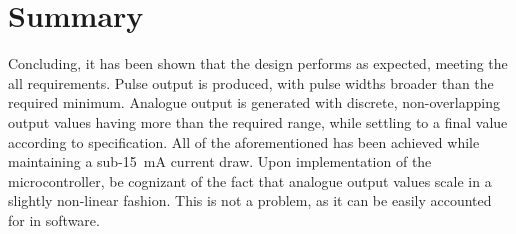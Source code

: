 \section{Summary}\label{sec:temp_summary}
Concluding, it has been shown that the design performs as expected, meeting the all requirements. Pulse output is produced, with pulse widths broader than the required minimum. Analogue output is generated with discrete, non-overlapping output values having more than the required range, while settling to a final value according to specification.  All of the aforementioned has been achieved while maintaining a sub-\SI{15}{mA} current draw. Upon implementation of the microcontroller, be cognizant of the fact that analogue output values scale in a slightly non-linear fashion. This is not a problem, as it can be easily accounted for in software.

